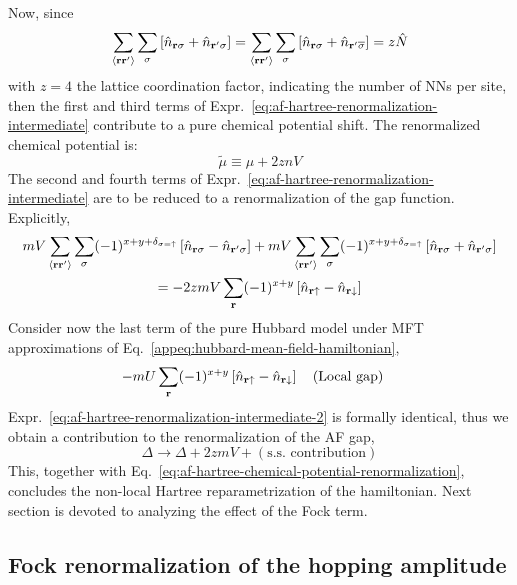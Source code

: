 Now, since
\[
	\sum_{\ev{\mathbf{r}\mathbf{r}'}} \sum_\sigma \left[
		\hat n_{\mathbf{r}\sigma} + \hat n_{\mathbf{r}'\sigma}
	\right] = \sum_{\ev{\mathbf{r}\mathbf{r}'}} \sum_\sigma \left[
		\hat n_{\mathbf{r}\sigma} + \hat n_{\mathbf{r}'\overline{\sigma}}
	\right] = z \hat N
\]
with $z=4$ the lattice coordination factor, indicating the number of NNs per site, then the first and third terms of Expr.~\eqref{eq:af-hartree-renormalization-intermediate} contribute to a pure chemical potential shift. The renormalized chemical potential is:
\begin{equation}\label{eq:af-hartree-chemical-potential-renormalization}
	\tilde{\mu} \equiv \mu + 2znV
\end{equation}
The second and fourth terms of Expr.~\eqref{eq:af-hartree-renormalization-intermediate} are to be reduced to a renormalization of the gap function. Explicitly,
\begin{multline}
	mV \sum_{\ev{\mathbf{r}\mathbf{r}'}} \sum_\sigma (-1)^{x+y+\delta_{\sigma=\uparrow}} \left[
		\hat n_{\mathbf{r}\sigma} - \hat n_{\mathbf{r}'\sigma}
	\right] + mV \sum_{\ev{\mathbf{r}\mathbf{r}'}} \sum_\sigma (-1)^{x+y+\delta_{\sigma=\uparrow}} \left[
		\hat n_{\mathbf{r}\sigma} + \hat n_{\mathbf{r}'\sigma}
	\right] \\
	= -2zmV \sum_\mathbf{r} (-1)^{x+y} \left[
		\hat n_{\mathbf{r}\uparrow} - \hat n_{\mathbf{r}\downarrow}
	\right] \label{eq:af-hartree-renormalization-intermediate-2}
\end{multline}
Consider now the last term of the pure Hubbard model under MFT approximations of Eq.~\eqref{appeq:hubbard-mean-field-hamiltonian},
\[
	- mU \sum_\mathbf{r} (-1)^{x+y} \left[
		\hat n_{\mathbf{r}\uparrow} - \hat n_{\mathbf{r}\downarrow}
	\right]
	\qq{(Local gap)}
\]
Expr.~\eqref{eq:af-hartree-renormalization-intermediate-2} is formally identical, thus we obtain a contribution to the renormalization of the AF gap,
\begin{equation}\label{eq:af-hartree-gap-os-renormalization}
	\Delta \to \Delta + 2zmV + (\text{s.s. contribution})
\end{equation}
This, together with Eq.~\eqref{eq:af-hartree-chemical-potential-renormalization}, concludes the non-local Hartree reparametrization of the hamiltonian. Next section is devoted to analyzing the effect of the Fock term.

\subsection{Fock renormalization of the hopping amplitude}\label{subsec:fock-renormalization-hopping-amplitude}

